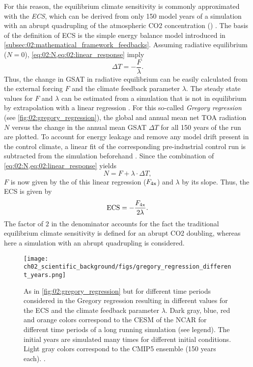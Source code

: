 For this reason, the equilibrium climate sensitivity is commonly approximated
with the \emph{\acf{ECS}}, which can be derived from only 150 model years of a
simulation with an abrupt quadrupling of the atmospheric \ac{CO2} concentration
() \autocite{Gregory2004}. The basis of the definition of \ac{ECS}
is the simple energy balance model introduced in
\cref{subsec:02:mathematical_framework_feedbacks}. Assuming radiative
equilibrium ($N = 0$), \cref{eq:02:N,eq:02:linear_response} imply
\begin{equation}
  \Delta T = -\frac{F}{\lambda}.
  \label{eq:02:delta_t_eq}
\end{equation} Thus, the change in \ac{GSAT} in radiative equilibrium can be
easily calculated from the external forcing $F$ and the climate feedback
parameter $\lambda$. The steady state values for $F$ and $\lambda$ can be
estimated from a  simulation that is not in equilibrium by
extrapolation with a linear regression \autocite{Gregory2004}. For this
so-called \emph{Gregory regression} (see \cref{fig:02:gregory_regression}), the
global and annual mean net \ac{TOA} radiation $N$ versus the change in the
annual mean \ac{GSAT} $\Delta T$ for all 150 years of the  run are
plotted. To account for energy leakage and remove any model drift present in
the control climate, a linear fit of the corresponding pre-industrial control
run is subtracted from the  simulation beforehand
\autocite{Andrews2012}. Since the combination of
\cref{eq:02:N,eq:02:linear_response} yields
\begin{equation}
  N = F + \lambda \cdot \Delta T,
  \label{eq:02:N_vs_delta_t}
\end{equation}
$F$ is now given by the \yintercept{} of this linear regression
($F_{\textnormal{4x}}$) and $\lambda$ by its slope. Thus, the \ac{ECS} is given by
\begin{equation}
  \textnormal{ECS} = -\frac{F_{\textnormal{4x}}}{2 \lambda}.
  \label{eq:02:ecs}
\end{equation}
The factor of $2$ in the denominator accounts for the fact the traditional
equilibrium climate sensitivity is defined for an abrupt \ac{CO2} doubling,
whereas here a simulation with an abrupt quadrupling is considered.

\begin{figure}[t]
  \centering
  \texttt{[image: 
    ch02\_scientific\_background/figs/gregory\_regression\_different\_years.png]}
  \caption[
  Gregory regression for different time periods.
  ]{
    As in \cref{fig:02:gregory_regression} but for different time periods
    considered in the Gregory regression resulting in different values for the
    \acf{ECS} and the climate feedback parameter $\lambda$. Dark gray, blue,
    red and orange colors correspond to the \acf{CESM} of the \acf{NCAR} for
    different time periods of a long running simulation (see legend). The
    initial years are simulated many times for different initial conditions.
    Light gray colors correspond to the \acs{CMIP}5 ensemble (150 years each).
    .
  }
  \label{fig:02:gregory_regression_different_years}
\end{figure}

